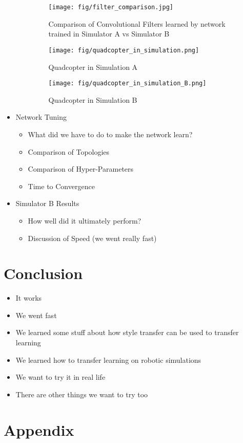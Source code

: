 \documentclass[paper=a4, fontsize=11pt]{scrartcl} %
\begin{document}
\begin{itemize}
\begin{itemize}
		\begin{figure}
		  \centering
		  \texttt{[image: fig/filter\_comparison.jpg]}
		  \caption{Comparison of Convolutional Filters learned by network trained in Simulator A vs Simulator B}
		  \label{fig:filter_comparison}
		\end{figure}

		\begin{figure}
		  \centering
		  \texttt{[image: fig/quadcopter\_in\_simulation.png]}
		  \caption{Quadcopter in Simulation A}
		  \label{fig:sim_A}
		\end{figure}

		\begin{figure}
		  \centering
		  \texttt{[image: fig/quadcopter\_in\_simulation\_B.png]}
		  \caption{Quadcopter in Simulation B}
		  \label{fig:sim_B}
		\end{figure}

	\end{itemize}

	\item Network Tuning
	\begin{itemize}
		\item What did we have to do to make the network learn?
		\item Comparison of Topologies
		\item Comparison of Hyper-Parameters
		\item Time to Convergence
	\end{itemize}

	\item Simulator B Results
	\begin{itemize}
		\item How well did it ultimately perform?
		\item Discussion of Speed (we went really fast)
	\end{itemize}

\end{itemize}

\section{Conclusion}

\begin{itemize}
	\item It works
	\item We went fast
	\item We learned some stuff about how style transfer can be used to transfer learning
	\item We learned how to transfer learning on robotic simulations
	\item We want to try it in real life
	\item There are other things we want to try too
\end{itemize}


\section{Appendix}




\end{document}
